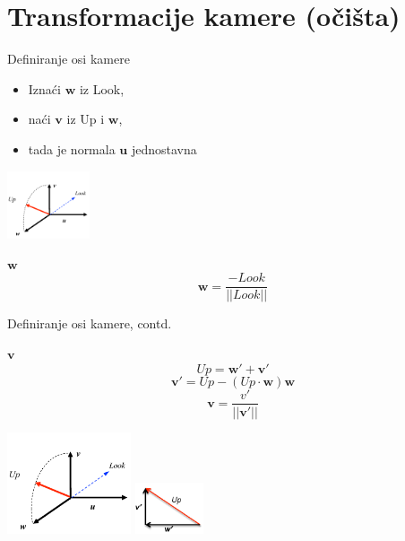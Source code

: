 \documentclass[9pt]{beamer}
\begin{document}
\section{Transformacije kamere (očišta)}
\begin{frame}{Definiranje osi kamere}
	
	\begin{itemize}
		\item Iznaći $\mathbf{w}$ iz Look, 
		\item naći $\mathbf{v}$ iz Up i $\mathbf{w}$, 
		\item tada je normala $\mathbf{u}$ jednostavna
	\end{itemize}
	
	\begin{center}
		\includegraphics[height=2cm]{slike/02_view_01.png}
	\end{center}
	\begin{block}{$\mathbf{w}$}
		\begin{equation}
		\mathbf{w} = \frac{-Look}{||Look||} \nonumber
		\end{equation}	
	\end{block}
\end{frame}

\begin{frame}{Definiranje osi kamere, contd.}
	\begin{block}{$\mathbf{v}$}
		\begin{equation}
		Up = \mathbf{w'} + \mathbf{v'} \nonumber
		\end{equation}	
		\begin{equation}
		\mathbf{v'} = Up - (Up \cdot \mathbf{w} ) \mathbf{w} \nonumber%
		\end{equation}
		\begin{equation}
		\mathbf{v} = \frac{v'}{||\mathbf{v'}||} \nonumber
		\end{equation}	
	\end{block}
	\begin{center}
		\includegraphics[height=3cm]{slike/02_view_01.png}
		\includegraphics[height=1.5cm]{slike/02_view_02.png}
	\end{center}
\end{frame}
\end{document}
